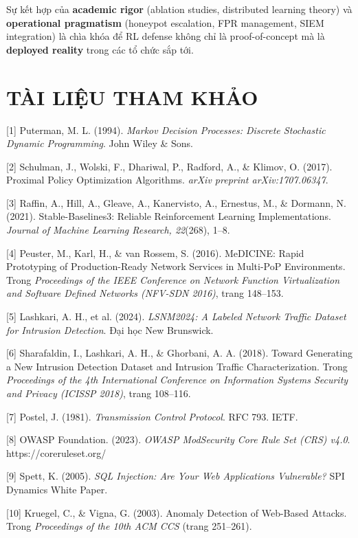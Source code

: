 \documentclass[12pt,a4paper,twoside]{report}
\begin{document}
{{{{{{{{{{{{{{Sự kết hợp của \textbf{academic rigor} (ablation studies, distributed learning theory) và \textbf{operational pragmatism} (honeypot escalation, FPR management, SIEM integration) là chìa khóa để RL defense không chỉ là proof-of-concept mà là \textbf{deployed reality} trong các tổ chức sắp tới.


\section{TÀI LIỆU THAM KHẢO}

[1] Puterman, M. L. (1994). \textit{Markov Decision Processes: Discrete Stochastic Dynamic Programming}. John Wiley & Sons.

[2] Schulman, J., Wolski, F., Dhariwal, P., Radford, A., & Klimov, O. (2017). Proximal Policy Optimization Algorithms. \textit{arXiv preprint arXiv:1707.06347}.

[3] Raffin, A., Hill, A., Gleave, A., Kanervisto, A., Ernestus, M., & Dormann, N. (2021). Stable-Baselines3: Reliable Reinforcement Learning Implementations. \textit{Journal of Machine Learning Research, 22}(268), 1–8.

[4] Peuster, M., Karl, H., & van Rossem, S. (2016). MeDICINE: Rapid Prototyping of Production-Ready Network Services in Multi-PoP Environments. Trong \textit{Proceedings of the IEEE Conference on Network Function Virtualization and Software Defined Networks (NFV-SDN 2016)}, trang 148–153.

[5] Lashkari, A. H., et al. (2024). \textit{LSNM2024: A Labeled Network Traffic Dataset for Intrusion Detection}. Đại học New Brunswick.

[6] Sharafaldin, I., Lashkari, A. H., & Ghorbani, A. A. (2018). Toward Generating a New Intrusion Detection Dataset and Intrusion Traffic Characterization. Trong \textit{Proceedings of the 4th International Conference on Information Systems Security and Privacy (ICISSP 2018)}, trang 108–116.

[7] Postel, J. (1981). \textit{Transmission Control Protocol}. RFC 793. IETF.

[8] OWASP Foundation. (2023). \textit{OWASP ModSecurity Core Rule Set (CRS) v4.0}. https://coreruleset.org/

[9] Spett, K. (2005). \textit{SQL Injection: Are Your Web Applications Vulnerable?} SPI Dynamics White Paper.

[10] Kruegel, C., & Vigna, G. (2003). Anomaly Detection of Web-Based Attacks. Trong \textit{Proceedings of the 10th ACM CCS} (trang 251–261).

}}}}}}}}}}}}}}
\end{document}
